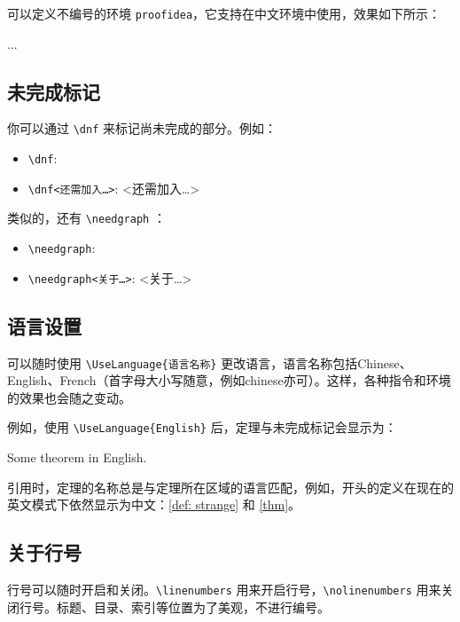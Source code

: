 \documentclass{einfart}
\begin{document}
可以定义不编号的环境 \lstinline|proofidea|，它支持在中文环境中使用，效果如下所示：

\begin{proofidea}
    ...
\end{proofidea}

\subsection{未完成标记}

你可以通过 \lstinline|\dnf| 来标记尚未完成的部分。例如：
\begin{itemize}
    \item \lstinline|\dnf|: \quad \dnf
    \item \lstinline|\dnf<还需加入…>|: \quad \dnf<还需加入…>
\end{itemize}

类似的，还有 \lstinline|\needgraph| ：
\begin{itemize}
    \item \lstinline|\needgraph|: \needgraph
    \item \lstinline|\needgraph<关于…>|: \needgraph<关于…>
\end{itemize}

\subsection{语言设置}
可以随时使用 \lstinline|\UseLanguage{语言名称}| 更改语言，语言名称包括Chinese、English、French（首字母大小写随意，例如chinese亦可）。这样，各种指令和环境的效果也会随之变动。

例如，使用 \lstinline|\UseLanguage{English}| 后，定理与未完成标记会显示为：

\begin{theorem}[Useless]\label{thm}
    Some theorem in English. \dnf
\end{theorem}

引用时，定理的名称总是与定理所在区域的语言匹配，例如，开头的定义在现在的英文模式下依然显示为中文：\cref{def: strange} 和 \cref{thm}。


\subsection{关于行号}
行号可以随时开启和关闭。\lstinline|\linenumbers| 用来开启行号，\lstinline|\nolinenumbers| 用来关闭行号。标题、目录、索引等位置为了美观，不进行编号。
\end{document}
